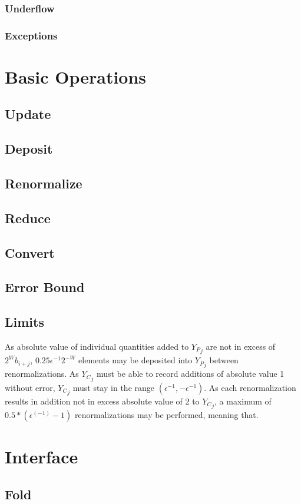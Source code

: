 \documentclass[12pt]{article}
\theoremstyle{plain}
\begin{document}
    \subsubsection{Underflow}
    \subsubsection{Exceptions}
\section{Basic Operations}
  \subsection{Update}
  \subsection{Deposit}
  \subsection{Renormalize}
  \subsection{Reduce}
  \subsection{Convert}
  \subsection{Error Bound}
  \subsection{Limits}
    \label{sec:limits}
    As absolute value of individual quantities added to ${Y_P}_j$ are not in excess of $2^W b_{i + j}$, $0.25\epsilon^{-1}2^{-W}$ elements may be deposited into ${Y_P}_j$ between renormalizations. As ${Y_C}_j$ must be able to record additions of absolute value 1 without error, ${Y_C}_j$ must stay in the range $(\epsilon^{-1}, -\epsilon^{-1})$. As each renormalization results in addition not in excess absolute value of 2 to ${Y_C}_j$, a maximum of $0.5 * (\epsilon^(-1) - 1)$ renormalizations may be performed, meaning that.
\section{Interface}
  \subsection{Fold}
\end{document}
